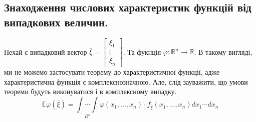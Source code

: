 \newpage

\subsection{Знаходження числових характеристик функцій від випадкових величин.}

\begin{boxteo}
Нехай є випадковий вектор $\overline{\xi} = \begin{bmatrix}
 \xi_1 \\
 \vdots \\
 \xi_n
\end{bmatrix}$. Та фукнція $\varphi: \mathbb{R}^n \to \mathbb{R}$. В такому вигляді, ми не можемо застосувати теорему до характеристичної функції, адже характеристична функція є комплекснозначною. Але, слід зауважити, що умови теореми будуть виконуватися і в комплексному випадку.
$$
\mathbb{E} \varphi(\overline{\xi}) = \underset{R^n}{ \int \cdots \int} \varphi (x_1, ..., x_n) \cdot f_{\overline{\xi}}(x_1, ..., x_n)dx_1 \cdots dx_n
$$
\end{boxteo}


